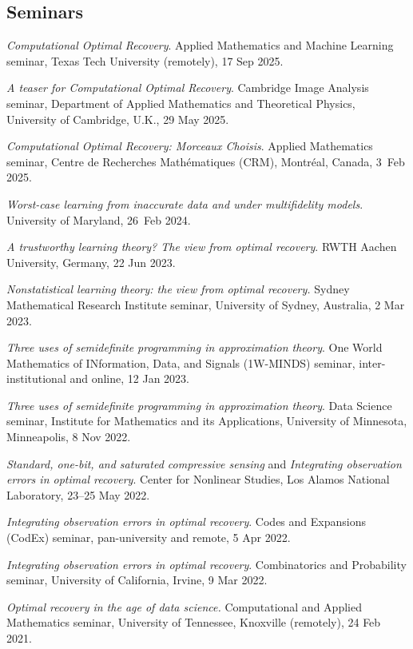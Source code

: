 \documentclass[11pt]{article}
\begin{document}
\subsection{Seminars}
\bitemize
\item{\sl Computational Optimal Recovery}.
Applied Mathematics and Machine Learning seminar,
Texas Tech University (remotely), 17 Sep 2025.
\item {\sl A teaser for Computational Optimal Recovery}.
Cambridge Image Analysis seminar,
Department of Applied Mathematics and Theoretical Physics, University of Cambridge, U.K., 29 May 2025. 
\item {\sl Computational Optimal Recovery: Morceaux Choisis}. Applied Mathematics seminar,
Centre de Recherches Math\'ematiques (CRM), Montr\'eal, Canada, 3~Feb 2025.
\item {\sl Worst-case learning from inaccurate data and under multifidelity models}.
University of Maryland, 26~Feb 2024.
\item {\sl A trustworthy learning theory? The view from optimal recovery}.
RWTH Aachen University, Germany, 22 Jun 2023.
\item {\sl Nonstatistical learning theory: the view from optimal recovery.}
Sydney Mathematical Research Institute seminar,
University of Sydney, Australia, 2 Mar 2023.
\item {\sl Three uses of semidefinite programming in approximation theory}.
One World Mathematics of INformation, Data, and Signals (1W-MINDS) seminar,
inter-institutional and online, 12 Jan 2023.
\item {\sl Three uses of semidefinite programming in approximation theory}.
 Data Science seminar,
 Institute for Mathematics and its Applications,
 University of Minnesota, Minneapolis, 8 Nov 2022.
\item {\sl Standard,  one-bit, and saturated compressive sensing} and {\sl Integrating observation errors in optimal recovery}.
Center for Nonlinear Studies, Los Alamos National Laboratory, 23--25 May 2022.
\item {\sl Integrating observation errors in optimal recovery}.  Codes and Expansions (CodEx) seminar,
pan-university and remote, 5 Apr 2022.
\item {\sl Integrating observation errors in optimal recovery}.
Combinatorics and Probability seminar, 
University of California, Irvine, 9 Mar 2022.
\item {\sl Optimal recovery in the age of data science.}
Computational and Applied Mathematics seminar,
University of Tennessee, Knoxville (remotely), 24 Feb 2021.
\end{document}
